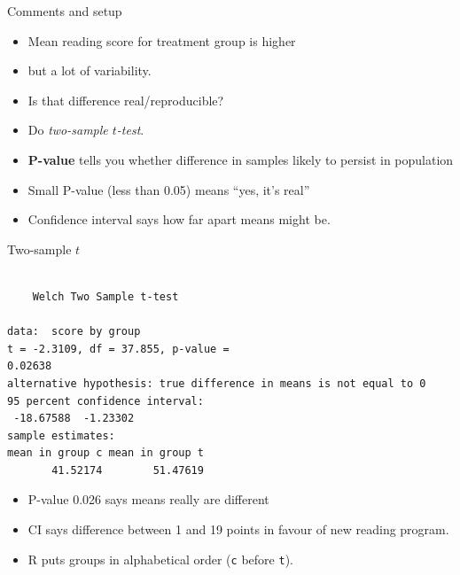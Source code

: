 \begin{frame}[fragile]{Comments and setup}
  
  \begin{itemize}
  \item Mean reading score for treatment group is higher
  \item but a lot of variability.
  \item Is that difference real/reproducible?
  \item Do \emph{two-sample $t$-test}.
  \item \textbf{P-value} tells you whether difference in samples
    likely to persist in population
  \item Small P-value (less than 0.05) means ``yes, it's real''
  \item Confidence interval says how far apart means might be.
  \end{itemize}
  
\end{frame}

\begin{frame}[fragile]{Two-sample $t$}

{\small

 
\begin{knitrout}
\color{fgcolor}\begin{kframe}
\begin{alltt}
\hlopt{~}
\end{alltt}
\begin{verbatim}

	Welch Two Sample t-test

data:  score by group
t = -2.3109, df = 37.855, p-value =
0.02638
alternative hypothesis: true difference in means is not equal to 0
95 percent confidence interval:
 -18.67588  -1.23302
sample estimates:
mean in group c mean in group t 
       41.52174        51.47619 
\end{verbatim}
\end{kframe}
\end{knitrout}

}

\begin{itemize}
\item P-value 0.026 says means really are different
\item CI says difference between 1 and 19 points in favour of new
  reading program.
\item R puts groups in alphabetical order (\texttt{c} before \texttt{t}).
\end{itemize}

\end{frame}


